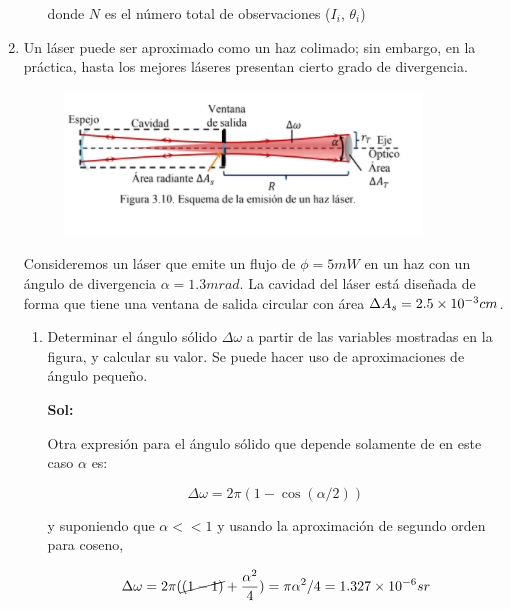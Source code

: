 \documentclass[12pt,a4paper]{article}
\begin{document}
\begin{enumerate}
\begin{enumerate}
    donde $N$ es el número total de observaciones ($I_i$, $\theta_i$) 
    
\end{enumerate}






\item Un láser puede ser aproximado como un haz colimado; sin embargo, en la práctica, hasta los mejores láseres presentan cierto grado de divergencia.

\begin{figure}[h!]
    \centering
    \includegraphics{Captura.PNG}
    \label{fig:my_label}
\end{figure}

Consideremos un láser que emite un flujo de $\phi = 5mW$ en un haz con un ángulo de divergencia $\alpha = 1.3 m rad$. La cavidad del láser está diseñada de forma que tiene una ventana de salida circular con área $\Delta A_s = \num{2.5 e -3} cm$.

\begin{enumerate}
    \item Determinar el ángulo sólido $\Delta \omega$ a partir de las variables mostradas en la figura, y calcular su valor. Se puede hacer uso de aproximaciones de ángulo pequeño.
    
    \textbf{Sol:}
    
    Otra expresión para el ángulo sólido que depende solamente de en este caso $\alpha$ es:
    
    \begin{equation*}
        \Delta \omega = 2 \pi (1 - \cos{(\alpha/2)})
    \end{equation*}
    
    \noindent y suponiendo que $\alpha << 1$ y usando la aproximación de segundo orden para coseno,
    
    \begin{equation*}
        \Delta \omega = 2 \pi (\cancel{(1 - 1)} +\frac{\alpha^2}{4}) = \pi \alpha^2/4 = \num{1.327 e-6} sr
    \end{equation*}
    

\end{enumerate}
\end{enumerate}
\end{document}

